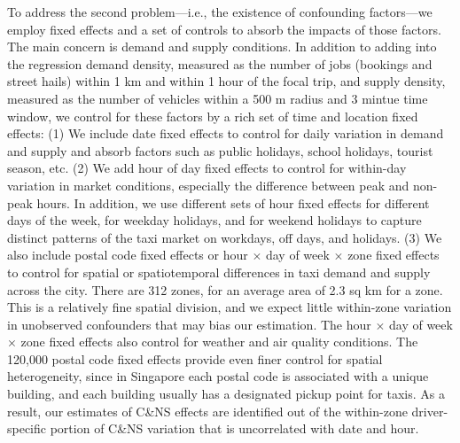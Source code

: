 \documentclass[reviewmode]{restat}
\begin{document}
To address the second problem---i.e., the existence of confounding factors---we employ fixed effects and a
set of controls to absorb the impacts of those factors. The main concern is demand and supply conditions.
In addition to adding  into the regression demand density, measured as the number of jobs (bookings and street 
hails) within 1 km and within 1 hour of the focal trip, and supply density, measured as the number of vehicles
within a 500 m radius and 3 mintue time window, we control for these factors by a rich set of time and
location fixed effects: (1) We include date fixed effects to control for daily variation in demand and 
supply and absorb factors such as public holidays, school holidays, tourist season, etc. (2) We add hour 
of day fixed effects to control for within-day variation in market conditions, especially the difference 
between peak and non-peak hours. In addition, we use different sets of hour fixed effects for different days 
of the week, for weekday holidays, and for weekend holidays to capture distinct patterns of the taxi market on 
workdays, off days, and holidays. (3)  We also include postal code fixed effects or hour $\times$ day of week
$\times$ zone fixed effects to control for spatial or spatiotemporal differences in taxi demand and supply
across the city. There are 312 zones, for an average area of 2.3 sq km for a zone. This is a relatively fine
spatial division, and we expect little within-zone variation in unobserved confounders that may bias our 
estimation. The  hour $\times$ day of week $\times$ zone fixed effects also control for weather and air 
quality conditions. The 120,000 postal code fixed effects provide even finer control for spatial 
heterogeneity, since in Singapore each postal code is associated with a unique building, and each building
usually has a designated pickup point for taxis. As a result, our estimates of C\&NS effects are identified 
out of the within-zone driver-specific portion of C\&NS variation that is uncorrelated with date and hour. 
\end{document}
